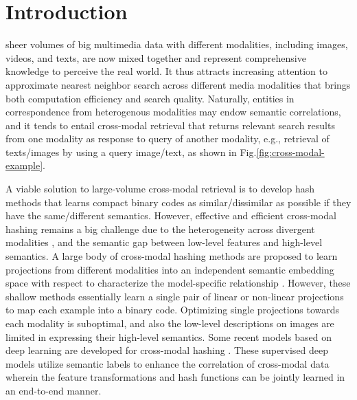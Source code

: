\documentclass[10pt,journal,twocolumn]{IEEEtran}
\begin{document}
\maketitle


\IEEEdisplaynontitleabstractindextext

\IEEEpeerreviewmaketitle

\section{Introduction}\label{sec:intro}


 sheer volumes of big multimedia data with different modalities, including images, videos, and texts, are now mixed together and represent comprehensive knowledge to perceive the real world. It thus attracts increasing attention to approximate nearest neighbor search across different media modalities that brings both computation efficiency and search quality. Naturally, entities in correspondence from heterogenous modalities may endow semantic correlations, and it tends to entail cross-modal retrieval that returns relevant search results from one modality as response to query of another modality, e.g., retrieval of texts/images by using a query image/text, as shown in Fig.\ref{fig:cross-modal-example}.


A viable solution to large-volume cross-modal retrieval is to develop hash methods that learns compact binary codes as similar/dissimilar as possible if they have the same/different semantics. However, effective and efficient cross-modal hashing remains a big challenge due to the heterogeneity across divergent modalities \cite{Semantics-hash}, and the semantic gap between low-level features and high-level semantics. A large body of cross-modal hashing methods are proposed to learn projections from different modalities into an independent semantic embedding space with respect to characterize the model-specific relationship \cite{LBMCH,Shao-TPAMI,Wu-cyber18,Yang-TNNLS17,Yang-TIP17,Wu-PR182,Yang-TIP15,YangCIKM2013,LinMM2013,Wu-PR18,YangMM2015}. However, these shallow methods essentially learn a single pair of linear or non-linear projections to map each example into a binary code. Optimizing single projections towards each modality is suboptimal, and also the low-level descriptions on images are limited in expressing their high-level semantics. Some recent models based on deep learning are developed for cross-modal hashing \cite{DVSH,CMDVH,Multimodal-hashing,Corr-AE,CAH,DCMH}. These supervised deep models utilize semantic labels to enhance the correlation of cross-modal data wherein the feature transformations and hash functions can be jointly learned in an end-to-end manner.
\end{document}
